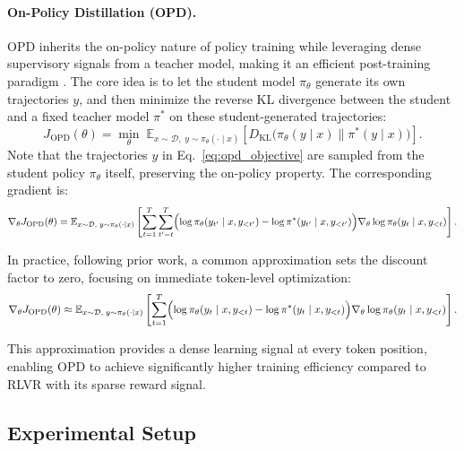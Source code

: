 \documentclass{article}
\begin{document}
\paragraph{On-Policy Distillation (OPD).}
OPD inherits the on-policy nature of policy training while leveraging dense supervisory signals from a teacher model, making it an efficient post-training paradigm \citep{Yang2026LearningBT}. The core idea is to let the student model $\pi_{\theta}$ generate its own trajectories $y$, and then minimize the reverse KL divergence between the student and a fixed teacher model $\pi^*$ on these student-generated trajectories:
\begin{equation}
J_{\text{OPD}}(\theta) = \min_{\theta} \; \mathbb{E}_{x \sim \mathcal{D}, \; y \sim \pi_{\theta}(\cdot \mid x)} \left[ D_{\text{KL}}\bigl(\pi_{\theta}(y \mid x) \parallel \pi^*(y \mid x)\bigr) \right].
\label{eq:opd_objective}
\end{equation}
Note that the trajectories $y$ in Eq.~\eqref{eq:opd_objective} are sampled from the student policy $\pi_{\theta}$ itself, preserving the on-policy property. The corresponding gradient is:
\begin{equation}
\nabla_{\theta} J_{\text{OPD}}(\theta) = \mathbb{E}_{x \sim \mathcal{D}, \; y \sim \pi_{\theta}(\cdot \mid x)} \left[ \sum_{t=1}^{T} \sum_{t'=t}^{T} \Bigl( \log \pi_{\theta}(y_{t'} \mid x, y_{<t'}) - \log \pi^*(y_{t'} \mid x, y_{<t'}) \Bigr) \nabla_{\theta} \log \pi_{\theta}(y_t \mid x, y_{<t}) \right].
\label{eq:opd_gradient_full}
\end{equation}

In practice, following prior work, a common approximation sets the discount factor to zero, focusing on immediate token-level optimization:
\begin{equation}
\nabla_{\theta} J_{\text{OPD}}(\theta) \approx \mathbb{E}_{x \sim \mathcal{D}, \; y \sim \pi_{\theta}(\cdot \mid x)} \left[ \sum_{t=1}^{T} \Bigl( \log \pi_{\theta}(y_t \mid x, y_{<t}) - \log \pi^*(y_t \mid x, y_{<t}) \Bigr) \nabla_{\theta} \log \pi_{\theta}(y_t \mid x, y_{<t}) \right].
\label{eq:opd_gradient_approx}
\end{equation}

This approximation provides a dense learning signal at every token position, enabling OPD to achieve significantly higher training efficiency compared to RLVR with its sparse reward signal.

\newpage
\subsection{Experimental Setup}
\label{Experimental Setup}
\end{document}
